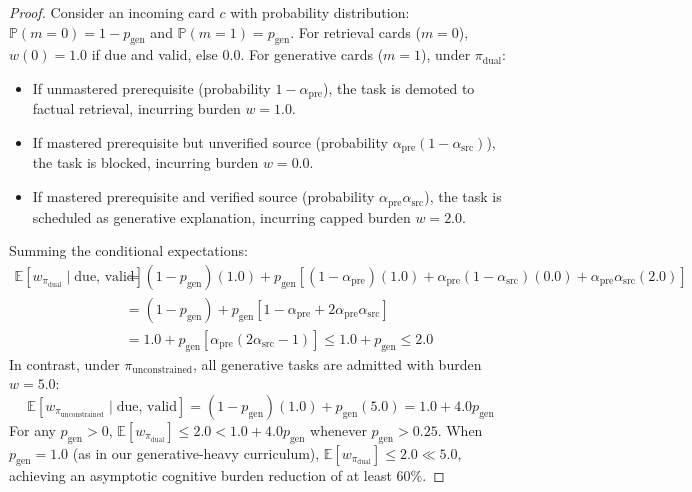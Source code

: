 \documentclass[11pt,a4paper]{article}
\begin{document}
\begin{proof}
Consider an incoming card $c$ with probability distribution:
$\mathbb{P}(m=0) = 1 - p_{\text{gen}}$ and $\mathbb{P}(m=1) = p_{\text{gen}}$.
For retrieval cards ($m=0$), $w(0) = 1.0$ if due and valid, else $0.0$.
For generative cards ($m=1$), under $\pi_{\text{dual}}$:
\begin{itemize}
    \item If unmastered prerequisite (probability $1 - \alpha_{\text{pre}}$), the task is demoted to factual retrieval, incurring burden $w = 1.0$.
    \item If mastered prerequisite but unverified source (probability $\alpha_{\text{pre}} (1 - \alpha_{\text{src}})$), the task is blocked, incurring burden $w = 0.0$.
    \item If mastered prerequisite and verified source (probability $\alpha_{\text{pre}} \alpha_{\text{src}}$), the task is scheduled as generative explanation, incurring capped burden $w = 2.0$.
\end{itemize}
Summing the conditional expectations:
\begin{align}
    \mathbb{E}[w_{\pi_{\text{dual}}} \mid \text{due, valid}] &= (1 - p_{\text{gen}})(1.0) + p_{\text{gen}} \left[ (1 - \alpha_{\text{pre}})(1.0) + \alpha_{\text{pre}}(1 - \alpha_{\text{src}})(0.0) + \alpha_{\text{pre}}\alpha_{\text{src}}(2.0) \right] \nonumber \\
    &= (1 - p_{\text{gen}}) + p_{\text{gen}} \left[ 1 - \alpha_{\text{pre}} + 2 \alpha_{\text{pre}} \alpha_{\text{src}} \right] \nonumber \\
    &= 1.0 + p_{\text{gen}} \left[ \alpha_{\text{pre}} (2\alpha_{\text{src}} - 1) \right] \le 1.0 + p_{\text{gen}} \le 2.0
\end{align}
In contrast, under $\pi_{\text{unconstrained}}$, all generative tasks are admitted with burden $w=5.0$:
\begin{equation}
    \mathbb{E}[w_{\pi_{\text{unconstrained}}} \mid \text{due, valid}] = (1 - p_{\text{gen}})(1.0) + p_{\text{gen}}(5.0) = 1.0 + 4.0 p_{\text{gen}}
\end{equation}
For any $p_{\text{gen}} > 0$, $\mathbb{E}[w_{\pi_{\text{dual}}}] \le 2.0 < 1.0 + 4.0 p_{\text{gen}}$ whenever $p_{\text{gen}} > 0.25$. When $p_{\text{gen}} = 1.0$ (as in our generative-heavy curriculum), $\mathbb{E}[w_{\pi_{\text{dual}}}] \le 2.0 \ll 5.0$, achieving an asymptotic cognitive burden reduction of at least $60\%$.
\end{proof}
\end{document}
